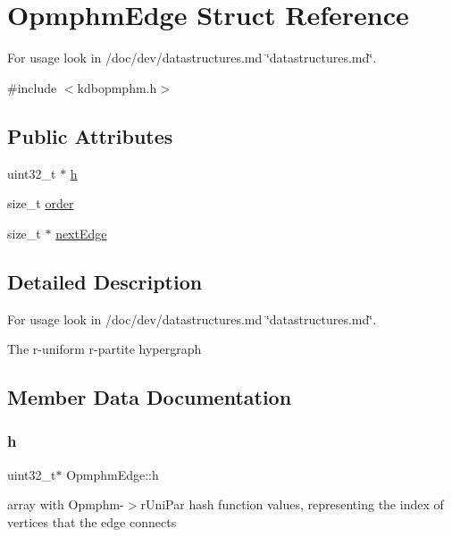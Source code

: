 \hypertarget{structOpmphmEdge}{}\section{Opmphm\+Edge Struct Reference}
\label{structOpmphmEdge}


For usage look in /doc/dev/datastructures.md \char`\"{}datastructures.\+md\char`\"{}.  




{\ttfamily \#include $<$kdbopmphm.\+h$>$}

\subsection*{Public Attributes}
\begin{DoxyCompactItemize}
\item 
uint32\+\_\+t $\ast$ \hyperlink{structOpmphmEdge_af2fb0b6cf2105d09b6e6fa6db1d643b5}{h}
\item 
size\+\_\+t \hyperlink{structOpmphmEdge_a6e4538c7c7f5d72f8ecab6aca834e8c8}{order}
\item 
size\+\_\+t $\ast$ \hyperlink{structOpmphmEdge_a1689e74757cbfcd2ee3e51eb9180c8a7}{next\+Edge}
\end{DoxyCompactItemize}


\subsection{Detailed Description}
For usage look in /doc/dev/datastructures.md \char`\"{}datastructures.\+md\char`\"{}. 

The r-\/uniform r-\/partite hypergraph 

\subsection{Member Data Documentation}
\mbox{\label{structOpmphmEdge_af2fb0b6cf2105d09b6e6fa6db1d643b5}} 
\subsubsection{\texorpdfstring{h}{h}}
{\footnotesize\ttfamily uint32\+\_\+t$\ast$ Opmphm\+Edge\+::h}

array with Opmphm-\/$>$r\+Uni\+Par hash function values, representing the index of vertices that the edge connects \mbox{\label{structOpmphmEdge_a1689e74757cbfcd2ee3e51eb9180c8a7}} 
